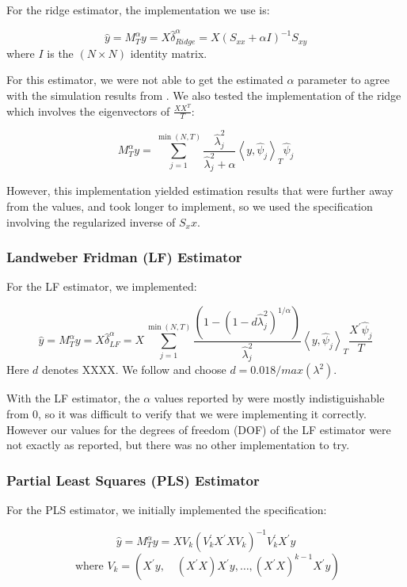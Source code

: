 For the ridge estimator, the implementation we use is:

\[\widehat{y} = M_{T}^{\alpha} y = X \hat{\delta}_{Ridge}^{\alpha} = X (S_{xx} + \alpha I)^{-1} S_{xy}\]
where $I$ is the $(N \times N)$ identity matrix.

For this estimator, we were not able to get the estimated $\alpha$ parameter to agree with the simulation results from \citeauthor{carrasco2016sample}. We also tested the implementation of the ridge which involves the eigenvectors of $\frac{X X^{T}}{T}$:

\[M_{T}^{\alpha} y = \sum_{j=1}^{\min (N, T)} \frac{\hat{\lambda}_{j}^{2}}{\hat{\lambda}_{j}^{2}+\alpha}\left\langle y, \hat{\psi}_{j}\right\rangle_{T} \hat{\psi}_{j}\]

However, this implementation yielded estimation results that were further away from the \citeauthor{carrasco2016sample} values, and took longer to implement, so we used the specification involving the regularized inverse of $S_xx$.

\subsubsection{Landweber Fridman (LF) Estimator}

For the LF estimator, we implemented:

\[\widehat{y} = M_{T}^{\alpha} y = X \hat{\delta}_{LF}^{\alpha} = X \sum_{j=1}^{\min (N, T)} \frac{\left(1-\left(1-d \widehat{\lambda}_{j}^{2}\right)^{1 / \alpha}\right)}{\widehat{\lambda}_{j}^{2}}\left\langle y, \hat{\psi}_{j}\right\rangle_{T} \frac{X^{\prime} \hat{\psi}_{j}}{T}\]
Here $d$ denotes XXXX. We follow \citeauthor{carrasco2016sample} and choose $d = 0.018/max(\lambda^2)$.

With the LF estimator, the $\alpha$ values reported by \citeauthor{carrasco2016sample} were mostly indistiguishable from 0, so it was difficult to verify that we were implementing it correctly. However our values for the degrees of freedom (DOF) of the LF estimator were not exactly as reported, but there was no other implementation to try.

\subsubsection{Partial Least Squares (PLS) Estimator}

For the PLS estimator, we initially implemented the specification:

\[\widehat{y} = M_{T}^{\alpha} y = X V_{k}\left(V_{k}^{\prime} X^{\prime} X V_{k}\right)^{-1} V_{k}^{\prime} X^{\prime} y\]
\[\text{ where } V_{k}=\left(X^{\prime} y, \quad\left(X^{\prime} X\right) X^{\prime} y, \ldots,\left(X^{\prime} X\right)^{k-1} X^{\prime} y\right)\]

